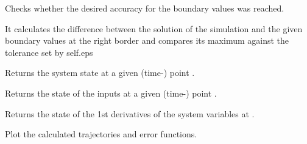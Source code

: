 \documentclass[letterpaper,10pt,english]{sphinxmanual}
\begin{document}
\begin{fulllineitems}
\begin{fulllineitems}
\end{fulllineitems}


\begin{fulllineitems}
\label{pytrajectory:pytrajectory.trajectory.Trajectory.checkAccuracy}
Checks whether the desired accuracy for the boundary values was reached.

It calculates the difference between the solution of the simulation
and the given boundary values at the right border and compares its
maximum against the tolerance set by self.eps

\end{fulllineitems}


\begin{fulllineitems}
\label{pytrajectory:pytrajectory.trajectory.Trajectory.x}
Returns the system state at a given (time-) point .

\end{fulllineitems}


\begin{fulllineitems}
\label{pytrajectory:pytrajectory.trajectory.Trajectory.u}
Returns the state of the inputs at a given (time-) point .

\end{fulllineitems}


\begin{fulllineitems}
\label{pytrajectory:pytrajectory.trajectory.Trajectory.dx}
Returns the state of the 1st derivatives of the system variables
at .

\end{fulllineitems}


\begin{fulllineitems}
\label{pytrajectory:pytrajectory.trajectory.Trajectory.plot}
Plot the calculated trajectories and error functions.


\end{fulllineitems}
\end{fulllineitems}
\end{document}
